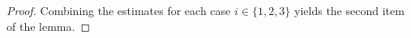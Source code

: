 \documentclass[10pt,a4paper]{amsart}
\newcommand{\Gnp}{G_{n, p}^{(3)}}
\renewcommand{\Pr}{\mathbb{P}}
\newcommand{\cF}{\mathcal{F}}
\newcommand{\cFQL}{\cF_Q^{\mathrm{low}}}
\newcommand{\ext}{\mathrm{ext}}
\renewcommand{\le}{\leqslant}
\begin{document}
\begin{proof}
    Combining the estimates for each case $i \in \{1,2,3\}$ yields the second item of the lemma. \qedhere

    




\end{proof}
\end{document}
